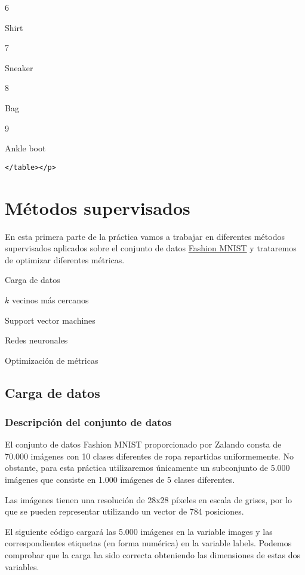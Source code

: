 \documentclass[11pt]{article}
\begin{document}
6

Shirt

7

Sneaker

8

Bag

9

Ankle boot

\begin{verbatim}
</table></p>
\end{verbatim}

\hypertarget{muxe9todos-supervisados}{%
\section{Métodos supervisados}\label{muxe9todos-supervisados}}

En esta primera parte de la práctica vamos a trabajar en diferentes
métodos supervisados aplicados sobre el conjunto de datos
\href{https://github.com/zalandoresearch/fashion-mnist}{Fashion MNIST} y
trataremos de optimizar diferentes métricas.

Carga de datos

\(k\) vecinos más cercanos

Support vector machines

Redes neuronales

Optimización de métricas

    \hypertarget{carga-de-datos}{%
\subsection{Carga de datos}\label{carga-de-datos}}

\hypertarget{descripciuxf3n-del-conjunto-de-datos}{%
\subsubsection{Descripción del conjunto de
datos}\label{descripciuxf3n-del-conjunto-de-datos}}

El conjunto de datos Fashion MNIST proporcionado por Zalando consta de
70.000 imágenes con 10 clases diferentes de ropa repartidas
uniformemente. No obstante, para esta práctica utilizaremos únicamente
un subconjunto de 5.000 imágenes que consiste en 1.000 imágenes de 5
clases diferentes.

Las imágenes tienen una resolución de 28x28 píxeles en escala de grises,
por lo que se pueden representar utilizando un vector de 784 posiciones.

El siguiente código cargará las 5.000 imágenes en la variable images y
las correspondientes etiquetas (en forma numérica) en la variable
labels. Podemos comprobar que la carga ha sido correcta obteniendo las
dimensiones de estas dos variables.
\end{document}
